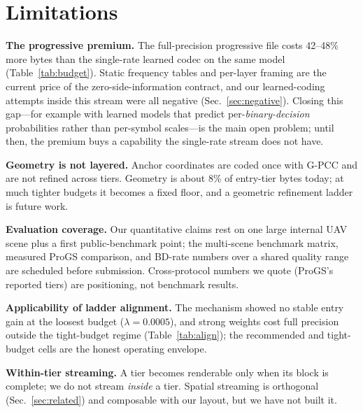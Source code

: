 \section{Limitations}
\label{sec:limits}

\textbf{The progressive premium.}
The full-precision progressive file costs 42--48\% more bytes than the single-rate learned codec on the same model (Table~\ref{tab:budget}).
Static frequency tables and per-layer framing are the current price of the zero-side-information contract, and our learned-coding attempts inside this stream were all negative (Sec.~\ref{sec:negative}).
Closing this gap---for example with learned models that predict per-\emph{binary-decision} probabilities rather than per-symbol scales---is the main open problem; until then, the premium buys a capability the single-rate stream does not have.

\textbf{Geometry is not layered.}
Anchor coordinates are coded once with G-PCC and are not refined across tiers. Geometry is about 8\% of entry-tier bytes today; at much tighter budgets it becomes a fixed floor, and a geometric refinement ladder is future work.

\textbf{Evaluation coverage.}
Our quantitative claims rest on one large internal UAV scene plus a first public-benchmark point; the multi-scene benchmark matrix, measured ProGS comparison, and BD-rate numbers over a shared quality range are scheduled before submission. Cross-protocol numbers we quote (ProGS's reported tiers) are positioning, not benchmark results.

\textbf{Applicability of ladder alignment.}
The mechanism showed no stable entry gain at the loosest budget ($\lambda{=}0.0005$), and strong weights cost full precision outside the tight-budget regime (Table~\ref{tab:align}); the recommended and tight-budget cells are the honest operating envelope.

\textbf{Within-tier streaming.}
A tier becomes renderable only when its block is complete; we do not stream \emph{inside} a tier. Spatial streaming is orthogonal (Sec.~\ref{sec:related}) and composable with our layout, but we have not built it.
